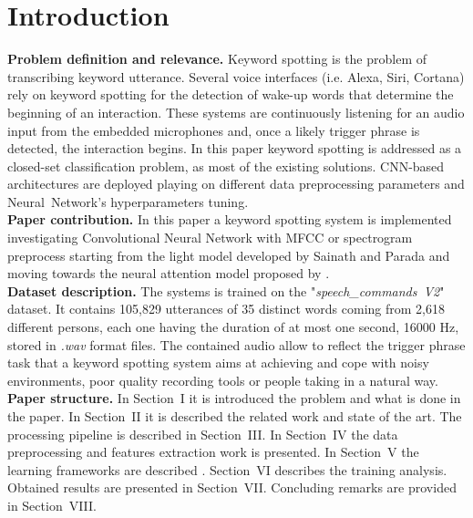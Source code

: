 
\section{Introduction}
\label{sec:introduction}
\noindent \textbf{Problem definition and relevance.} Keyword spotting is the problem of transcribing keyword utterance. Several voice interfaces (i.e. Alexa, Siri, Cortana) rely on keyword spotting for the detection of wake-up words that determine the beginning of an interaction. These systems are continuously listening for an audio input from the embedded microphones and, once a likely trigger phrase is detected, the interaction begins. 
In this paper keyword spotting is addressed as a closed-set classification problem, as most of the existing solutions. CNN-based architectures are deployed playing on different data preprocessing parameters and \mbox{Neural Network's} hyperparameters tuning.\\

\noindent \textbf{Paper contribution.} In this paper a keyword spotting system is implemented investigating Convolutional Neural Network with MFCC or spectrogram preprocess starting from the light model developed by Sainath and Parada \cite{sainath2015convolutional} and moving towards the neural attention model proposed by \cite{de2018neural}. \\

\noindent \textbf{Dataset description.} \cite{Warden-2018} The systems is trained on the \mbox{"{\it speech\_commands V2}"} dataset. It contains 105,829 utterances of 35 distinct words coming from 2,618 different persons, each one having the duration of at most one second, 16000 Hz, stored in {\it .wav} format files. The contained audio allow to reflect the trigger phrase task that a keyword spotting system aims at achieving and cope with noisy environments, poor quality recording tools or people taking in a natural way. \\ 

\noindent \textbf{Paper structure.} In Section~I it is introduced the problem and what is done in the paper. In Section~II it is described the related work and state of the art. The processing pipeline is described in Section~III. In Section~IV the data preprocessing and features extraction work is presented. In Section~V the learning frameworks are described . Section~VI describes the training analysis. Obtained results are presented in Section~VII.  Concluding remarks are provided in Section~VIII.

